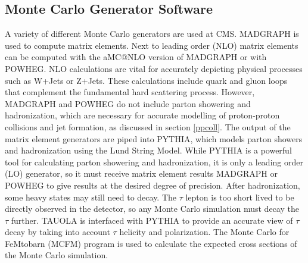 \documentclass[oneside, letterpaper, oldfontcommands]{memoir}
\begin{document}
\subsection{Monte Carlo Generator Software}\label{mcsoftware}

\qquad A variety of different Monte Carlo generators are used at CMS. MADGRAPH \cite{Alwall:2014hca} is used to compute matrix elements. Next to leading order (NLO) matrix elements can be computed with the aMC@NLO\cite{Alwall:2014hca} version of MADGRAPH or with POWHEG\cite{Alioli:2010xd, Frixione:2007vw, Nason:2004rx}. NLO calculations are vital for accurately depicting physical processes such as W+Jets or Z+Jets. These calculations include quark and gluon loops that complement the fundamental hard scattering process. However, MADGRAPH and POWHEG do not include parton showering and hadronization, which are necessary for accurate modelling of proton-proton collisions and jet formation, as discussed in section \ref{ppcoll}. The output of the matrix element generators are piped into PYTHIA, which models parton showers and hadronization using the Lund String Model. While PYTHIA is a powerful tool for calculating parton showering and hadronization, it is only a leading order (LO) generator, so it must receive matrix element results MADGRAPH or POWHEG to give results at the desired degree of precision. After hadronization, some heavy states may still need to decay. The $\tau$ lepton is too short lived to be directly observed in the detector, so any Monte Carlo simulation must decay the $\tau$ further. 
TAUOLA \cite{Was:2011tv} is interfaced with PYTHIA to provide an accurate view of $\tau$ decay by taking into account $\tau$ helicity and polarization. The Monte Carlo for FeMtobarn (MCFM) program \cite{Campbell:1999ah}\cite{Campbell:2011bn}\cite{Campbell:2015qma} is used to calculate the expected cross sections of the Monte Carlo simulation. 
\end{document}
